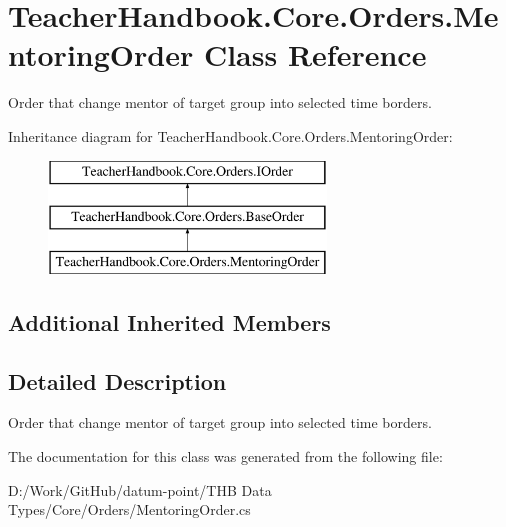 \hypertarget{class_teacher_handbook_1_1_core_1_1_orders_1_1_mentoring_order}{}\section{Teacher\+Handbook.\+Core.\+Orders.\+Mentoring\+Order Class Reference}
\label{class_teacher_handbook_1_1_core_1_1_orders_1_1_mentoring_order}


Order that change mentor of target group into selected time borders.  


Inheritance diagram for Teacher\+Handbook.\+Core.\+Orders.\+Mentoring\+Order\+:\begin{figure}[H]
\begin{center}
\leavevmode
\includegraphics[height=3.000000cm]{d8/d91/class_teacher_handbook_1_1_core_1_1_orders_1_1_mentoring_order}
\end{center}
\end{figure}
\subsection*{Additional Inherited Members}


\subsection{Detailed Description}
Order that change mentor of target group into selected time borders. 



The documentation for this class was generated from the following file\+:\begin{DoxyCompactItemize}
\item 
D\+:/\+Work/\+Git\+Hub/datum-\/point/\+T\+H\+B Data Types/\+Core/\+Orders/Mentoring\+Order.\+cs\end{DoxyCompactItemize}
